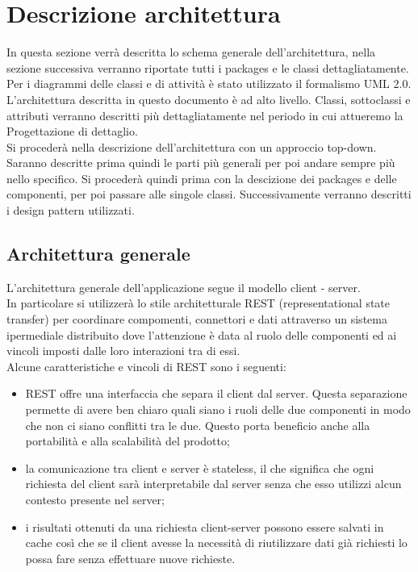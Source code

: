 \section{Descrizione architettura} 
\label{architettura}
	In questa sezione verrà descritta lo schema generale dell'architettura, nella sezione successiva %
	verranno riportate tutti i packages e le classi dettagliatamente.
	 Per i diagrammi delle classi e di attività è stato utilizzato il formalismo UML 2.0. \\
	 L'architettura descritta in questo documento è ad alto livello. Classi, sottoclassi e attributi verranno descritti più dettagliatamente nel periodo in cui attueremo la Progettazione di dettaglio. \\
	 Si procederà nella descrizione dell'architettura con un approccio top-down. Saranno descritte prima quindi le parti più generali per poi andare sempre più nello specifico. Si procederà quindi prima con la descizione dei packages e delle componenti, per poi passare alle singole classi. Successivamente verranno descritti i design pattern utilizzati.
	
	\subsection{Architettura generale}
	L'architettura generale dell'applicazione segue il modello client - server. \\
	In particolare si utilizzerà lo stile architetturale REST (representational state transfer) per coordinare compomenti, connettori e dati attraverso un sistema ipermediale distribuito dove l'attenzione è data al ruolo delle componenti ed ai vincoli imposti dalle loro interazioni tra di essi. \\
	Alcune caratteristiche e vincoli di REST sono i seguenti:	
	\begin{itemize}
		\item REST offre una interfaccia che separa il client dal server. Questa separazione permette di avere ben chiaro quali siano i ruoli delle due componenti in modo che non ci siano conflitti tra le due. Questo porta beneficio anche alla portabilità e alla scalabilità del prodotto;
		\item la comunicazione tra client e server è stateless, il che significa che ogni richiesta del client sarà interpretabile dal server senza che esso utilizzi alcun contesto presente nel server;
		\item i risultati ottenuti da una richiesta client-server possono essere salvati in cache così che se il client avesse la necessità di riutilizzare dati già richiesti lo possa fare senza effettuare nuove richieste.	
	\end{itemize}
	
